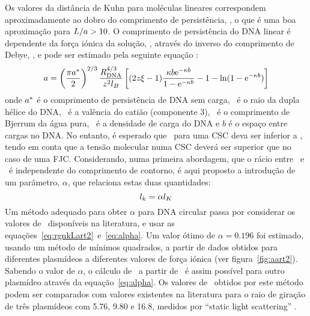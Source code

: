 %
%
Os valores da distância de Kuhn para moléculas lineares correspondem aproximadamente ao dobro do comprimento de persistência, \persis, o que é uma boa aproximação para $L/a>10$.
%
%
O comprimento de persistência do DNA linear é dependente da força iónica da solução, \forcaionica, através do inverso do comprimento de Debye, \inversodebye, e pode ser estimado pela seguinte equação \cite{latu09,manning}:
%
%
\begin{equation}
\label{eq:persisart2}
a=\left(\frac{\pi a^{*}}{2}\right)^{2/3}\frac{R_{\mathrm{DNA}}^{4/3}}{z^{2}l_{B}}\left[(2z\xi-1)\frac{\kappa b \mathrm{e}^{-\kappa b}}{1-\mathrm{e}^{-\kappa b}}-1-\ln(1-\mathrm{e}^{-\kappa b})\right]
\end{equation}
onde $a^{*}$ é o comprimento de persistência de DNA sem carga, \raioduplahelice\ é o raio da dupla hélice do DNA, \cargaeletrica\ é a valência do catião (componente 3), \bjerrum\ é o comprimento de Bjerrum da água pura, \densidadecarga\ é a densidade de carga do DNA e $b$ é o espaço entre cargas no DNA.
%
%
%
%
No entanto, é esperado que \comsegmento\ para uma CSC deva ser inferior a \kuhn, tendo em conta que a tensão molecular numa CSC deverá ser superior que no caso de uma FJC. Considerando, numa primeira abordagem, que o rácio entre \numsegmento\ e \kuhn\ é independente do comprimento de contorno, é aqui proposto a introdução de um parâmetro, $\alpha$, que relaciona estas duas quantidades:
\begin{equation}
\label{eq:alpha}
l_{k}=\alpha l_{K}
\end{equation}
Um método adequado para obter $\alpha$ para DNA circular passa por considerar os valores de \raiogiracao\ disponíveis na literatura, e usar as equações~\ref{eq:rgnkLart2}~e~\ref{eq:alpha}. Um valor ótimo de $\alpha=0.196$ foi estimado, usando um método de mínimos quadrados, a partir de dados obtidos para diferentes plasmídeos a diferentes valores de força iónica (ver figura~\ref{fig:aart2}). Sabendo o valor de $\alpha$, o cálculo de \numsegmento\ a partir de \kuhn\ é assim possível para outro plasmídeo através da equação~\ref{eq:alpha}. Os valores de \raiogiracao\ obtidos por este método podem ser comparados com valores existentes na literatura para o raio de giração de três plasmídeos com 5.76, 9.80 e 16.8\kpb, medidos por ``static light scattering'' \cite{latusls}.
